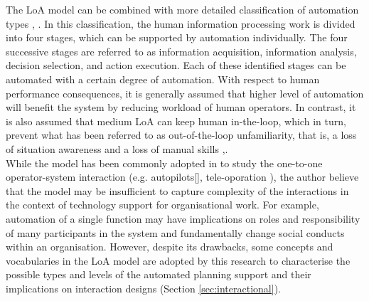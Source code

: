The LoA model can be combined with more detailed classification of automation types \cite{Parasuraman2000}, \cite{Manzey2012}. In this classification,  the human information processing work is divided into four stages, which can be supported by automation individually. The four successive stages are referred to as information acquisition, information analysis, decision selection, and action execution. Each of these identified stages can be automated with a certain degree of automation. With respect to human performance consequences, it is generally assumed that higher level of automation will benefit the system by reducing workload of human operators. In contrast, it is also assumed that medium \ac{LoA} can keep human in-the-loop, which in turn, prevent what has been referred to as out-of-the-loop unfamiliarity, that is, a loss of situation awareness and a loss of manual skills \cite{Kaber1997},\cite{Parasuraman2010}.\\

While the model has been commonly adopted in to study the one-to-one operator-system interaction (e.g. autopilots[], tele-oporation \cite{Schwarz2014}), the author believe that the model may be insufficient to capture complexity of the interactions in the context of technology support for organisational work. For example, automation of a single function may have implications on roles and responsibility of many participants in the system and fundamentally change social conducts within an organisation. However, despite its drawbacks, some concepts and vocabularies in the \ac{LoA} model are adopted by this research to characterise the possible types and levels of the automated planning support and their implications on interaction designs (Section \ref{sec:interactional}).\\

